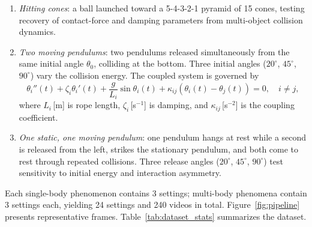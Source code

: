 \documentclass[runningheads]{llncs}
\begin{document}
\begin{enumerate}
    \item \emph{Hitting cones}: a ball launched toward a 5-4-3-2-1 pyramid of 15 cones, testing recovery of contact-force and damping parameters from multi-object collision dynamics.
    \item \emph{Two moving pendulums}: two pendulums released simultaneously from the same initial angle $\theta_0$, colliding at the bottom. Three initial angles ($20^\circ$, $45^\circ$, $90^\circ$) vary the collision energy. The coupled system is governed by
    \begin{equation}
        \theta_i''(t) + \zeta_i\theta_i'(t) + \frac{g}{L_i}\sin\theta_i(t)
        + \kappa_{ij}(\theta_i(t) - \theta_j(t)) = 0,
        \quad i \neq j,
        \label{eq:two_pendulums}
    \end{equation}
    where $L_i$\,[m] is rope length, $\zeta_i$\,[s$^{-1}$] is damping, and $\kappa_{ij}$\,[s$^{-2}$] is the coupling coefficient.
    \item \emph{One static, one moving pendulum}: one pendulum hangs at rest while a second is released from the left, strikes the stationary pendulum, and both come to rest through repeated collisions. Three release angles ($20^\circ$, $45^\circ$, $90^\circ$) test sensitivity to initial energy and interaction asymmetry.
\end{enumerate}

Each single-body phenomenon contains 3 settings; multi-body phenomena contain 3 settings each, yielding 24 settings and 240 videos in total. Figure~\ref{fig:pipeline} presents representative frames. Table~\ref{tab:dataset_stats} summarizes the dataset.
\end{document}
